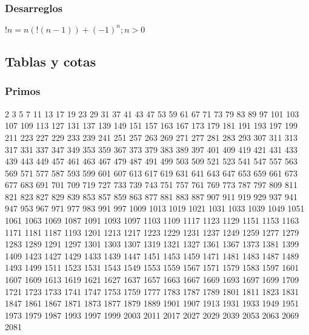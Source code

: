 \documentclass[10pt, landscape, twocolumn, a4paper, notitlepage]{article}
\begin{document}
\subsubsection{Desarreglos}
$!n = n(!(n - 1)) + (-1)^n; n > 0$ 
\subsection{Tablas y cotas}
\subsubsection{Primos}
2 3 5 7 11 13 17 19 23 29
31 37 41 43 47 53 59 61 67 71
73 79 83 89 97 101 103 107 109 113
127 131 137 139 149 151 157 163 167 173
179 181 191 193 197 199 211 223 227 229
233 239 241 251 257 263 269 271 277 281
283 293 307 311 313 317 331 337 347 349
353 359 367 373 379 383 389 397 401 409
419 421 431 433 439 443 449 457 461 463
467 479 487 491 499 503 509 521 523 541
547 557 563 569 571 577 587 593 599 601
607 613 617 619 631 641 643 647 653 659
661 673 677 683 691 701 709 719 727 733
739 743 751 757 761 769 773 787 797 809
811 821 823 827 829 839 853 857 859 863
877 881 883 887 907 911 919 929 937 941
947 953 967 971 977 983 991 997 1009 1013
1019 1021 1031 1033 1039 1049 1051 1061 1063 1069
1087 1091 1093 1097 1103 1109 1117 1123 1129 1151
1153 1163 1171 1181 1187 1193 1201 1213 1217 1223
1229 1231 1237 1249 1259 1277 1279 1283 1289 1291
1297 1301 1303 1307 1319 1321 1327 1361 1367 1373
1381 1399 1409 1423 1427 1429 1433 1439 1447 1451
1453 1459 1471 1481 1483 1487 1489 1493 1499 1511
1523 1531 1543 1549 1553 1559 1567 1571 1579 1583
1597 1601 1607 1609 1613 1619 1621 1627 1637 1657
1663 1667 1669 1693 1697 1699 1709 1721 1723 1733
1741 1747 1753 1759 1777 1783 1787 1789 1801 1811
1823 1831 1847 1861 1867 1871 1873 1877 1879 1889
1901 1907 1913 1931 1933 1949 1951 1973 1979 1987
1993 1997 1999 2003 2011 2017 2027 2029 2039 2053
2063 2069 2081

\end{document}
